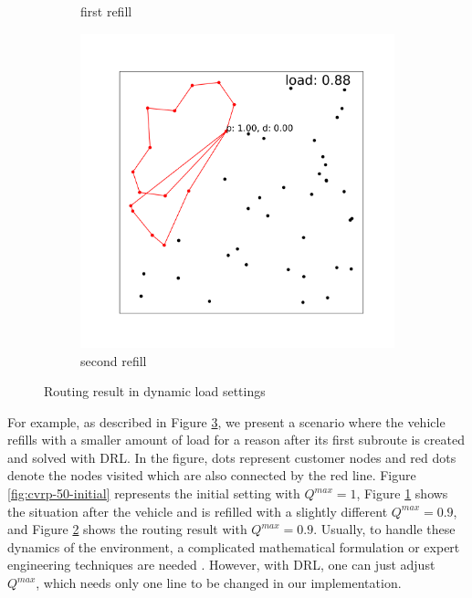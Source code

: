 \documentclass{article}
\begin{document}
\begin{figure}
\begin{subfigure}[]{0.32\linewidth}
        \caption{first refill}
        \label{fig:cvrp-50-one_subroute}
    \end{subfigure}
    \begin{subfigure}[]{0.32\linewidth}
        \includegraphics[width=\linewidth]{figures/50-17-am.png}
        \caption{second refill}
        \label{fig:cvrp-50-two_subroutes}
    \end{subfigure}
    \caption{Routing result in dynamic load settings}
    \label{fig:dynamic load setting figures}
\end{figure}

For example, as described in Figure \ref{fig:dynamic load setting figures}, we present a scenario where the vehicle refills with a smaller amount of load for a reason after its first subroute is created and solved with DRL. In the figure, dots represent customer nodes and red dots denote the nodes visited which are also connected by the red line. Figure \ref{fig:cvrp-50-initial} represents the initial setting with $Q^{max}=1$, Figure \ref{fig:cvrp-50-one_subroute} shows the situation after the vehicle and is refilled with a slightly different $Q^{max}=0.9$, and Figure \ref{fig:cvrp-50-two_subroutes} shows the routing result with $Q^{max}=0.9$. Usually, to handle these dynamics of the environment, a complicated mathematical formulation or expert engineering techniques are needed \cite{dynamicVRP}. However, with DRL, one can just adjust $Q^{max}$, which needs only one line to be changed in our implementation.
\end{document}
